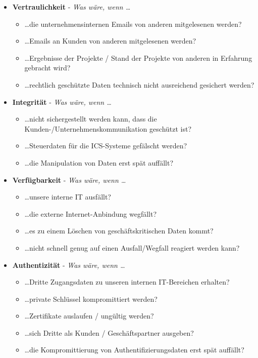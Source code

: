 \begin{itemize}
    \itemsep0.5em
    \item \textbf{Vertraulichkeit} - \textit{Was wäre, wenn \ldots}
    \begin{itemize}
        \item[] \ldots die unternehmensinternen Emails von anderen mitgelesenen werden?
        \item[] \ldots Emails an Kunden von anderen mitgelesenen werden?
        \item[] \ldots Ergebnisse der Projekte / Stand der Projekte von anderen in Erfahrung gebracht wird?
        \item[] \ldots rechtlich geschützte Daten technisch nicht ausreichend gesichert werden?
    \end{itemize}
    \item \textbf{Integrität} - \textit{Was wäre, wenn \ldots}
    \begin{itemize}
        \item[] \ldots nicht sichergestellt werden kann, dass die Kunden-/Unternehmenskommunikation geschützt ist?
        \item[] \ldots Steuerdaten für die ICS-Systeme gefälscht werden?
        \item[] \ldots die Manipulation von Daten erst spät auffällt?
    \end{itemize}
    \item \textbf{Verfügbarkeit} - \textit{Was wäre, wenn \ldots}
    \begin{itemize}
        \item[] \ldots unsere interne IT ausfällt?
        \item[] \ldots die externe Internet-Anbindung wegfällt?
        \item[] \ldots es zu einem Löschen von geschäftskritischen Daten kommt?
        \item[] \ldots nicht schnell genug auf einen Ausfall/Wegfall reagiert werden kann?
    \end{itemize}
    \item \textbf{Authentizität} - \textit{Was wäre, wenn \ldots}
    \begin{itemize}
        \item[] \ldots Dritte Zugangsdaten zu unseren internen IT-Bereichen erhalten?
        \item[] \ldots private Schlüssel kompromittiert werden?
        \item[] \ldots Zertifikate auslaufen / ungültig werden?
        \item[] \ldots sich Dritte als Kunden / Geschäftspartner ausgeben?
        \item[] \ldots die Kompromittierung von Authentifizierungsdaten erst spät auffällt?
    \end{itemize}
\end{itemize}

